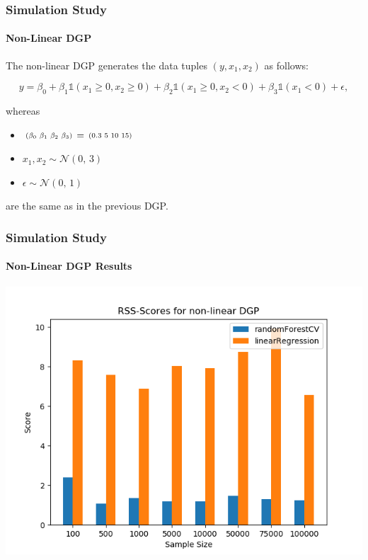 \begin{frame}
    \frametitle{Simulation Study}
    \framesubtitle{Non-Linear DGP}
    The non-linear DGP generates the data tuples \( (y, x_{1}, x_{2}) \) as follows:

    \begin{equation*}\label{eq:non_linear_dgp}
        y = \beta_{0} + \beta_{1} \mathds{1}(x_{1} \geq 0, x_{2} \geq 0) + \beta_{2} \mathds{1}(x_{1} \geq 0, x_{2} < 0) + \beta_{3} \mathds{1}(x_{1} < 0) + \epsilon,
    \end{equation*}
    
    whereas
    \begin{itemize}
        \item $ \begin{smallmatrix}(\beta_{0} & \beta_{1} & \beta_{2} & \beta_{3})\end{smallmatrix} = \begin{smallmatrix}(0.3 & 5 & 10 & 15)\end{smallmatrix}$
        \item $x_{1}, x_{2} \sim \mathcal{N}(0,\,3)$
        \item $\epsilon \sim \mathcal{N}(0,\,1)$
    \end{itemize}
    are the same as in the previous DGP.
\end{frame}

\begin{frame}
    \frametitle{Simulation Study}
    \framesubtitle{Non-Linear DGP Results}
	\begin{center}		
		\includegraphics[height=0.7\textheight]{images/forest_vs_ols_nonlinearDGP.png}
	\end{center}
\end{frame}